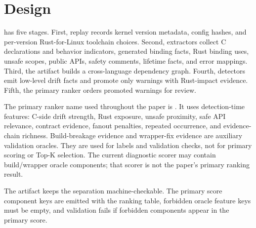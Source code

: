 \section{Design}

\tool{} has five stages. First, replay records kernel version metadata, config
hashes, and per-version Rust-for-Linux toolchain choices. Second, extractors
collect C declarations and behavior indicators, generated binding facts, Rust
binding uses, unsafe scopes, public APIs, safety comments, lifetime facts, and
error mappings. Third, the artifact builds a cross-language dependency graph.
Fourth, detectors emit low-level drift facts and promote only warnings with
Rust-impact evidence. Fifth, the primary ranker orders promoted warnings for
review.

The primary ranker name used throughout the paper is \primary{}. It uses
detection-time features: C-side drift strength, Rust exposure, unsafe
proximity, safe API relevance, contract evidence, fanout penalties, repeated
occurrence, and evidence-chain richness. Build-breakage evidence and
wrapper-fix evidence are auxiliary validation oracles. They are used for labels
and validation checks, not for primary scoring or Top-K selection. The current
diagnostic scorer may contain build/wrapper oracle components; that scorer is
not the paper's primary ranking result.



The artifact keeps the separation machine-checkable. The primary score
component keys are emitted with the ranking table, forbidden oracle feature
keys must be empty, and validation fails if forbidden components appear in the
primary score.
